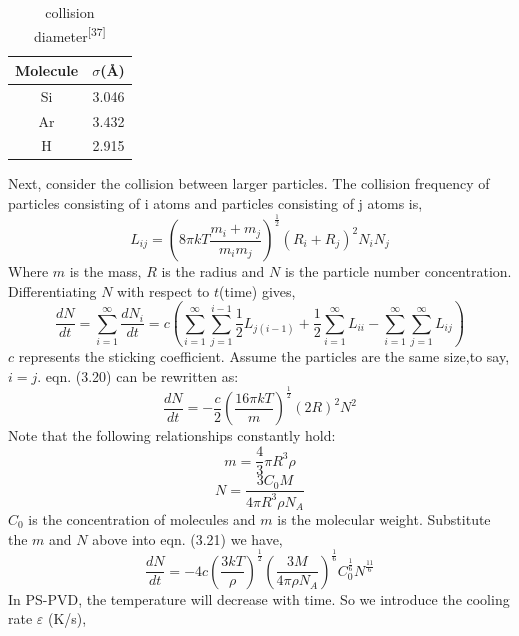 \begin{table}[H]
\caption{collision diameter\textsuperscript{[37]}}
\centering
\begin{tabular}{cc}
\toprule
Molecule &  $\sigma$(\AA) \\
\midrule
Si       & 3.046 \\
Ar       & 3.432 \\
H        & 2.915 \\
\bottomrule
\end{tabular}
\end{table}
Next, consider the collision between larger particles. 
The collision frequency of particles consisting of i atoms and particles consisting of j atoms is,
\begin{equation}
L_{i j}=\left(8 \pi k T \frac{m_{i}+m_{j}}{m_{i} m_{j}}\right)^{\frac{1}{2}}\left(R_{i}+R_{j}\right)^{2} N_{i} N_{j}
\tag{3.1.19}
\end{equation}
Where $m$ is the mass, $R$ is the radius and $N$ is the particle number concentration.
Differentiating $N$ with respect to $t$(time) gives,
\begin{equation}
\frac{d N}{d t}=\sum_{i=1}^{\infty} \frac{d N_{i}}{d t}=c\left(\sum_{i=1}^{\infty} \sum_{j=1}^{i-1} \frac{1}{2} L_{j(i-1)}+\frac{1}{2} \sum_{i=1}^{\infty} L_{ii}-\sum_{i=1}^{\infty} \sum_{j=1}^{\infty} L_{i j}\right)
\tag{3.1.20}
\end{equation}
$c$ represents the sticking coefficient.
Assume the particles are the same size,to say, $i = j$.  eqn. (3.20) can be rewritten as:
\begin{equation}
\frac{d N}{d t}=-\frac{c}{2}\left(\frac{16 \pi k T}{m}\right)^{\frac{1}{2}}(2 R)^{2} N^{2}
\tag{3.1.21}
\end{equation}
Note that the following relationships  constantly hold:
\begin{equation}
m=\frac{4}{3} \pi R^{3} \rho
\tag{i}
\end{equation}
\begin{equation}
N=\frac{3 C_{0} M}{4 \pi R^{3} \rho N_{A}}
\tag{ii}
\end{equation}
$C_{0}$  is the concentration of molecules and $m$ is the molecular weight.
Substitute the $m$ and $N$ above into eqn. (3.21) we have,
\begin{equation}
\frac{d N}{d t}=-4 c\left(\frac{3 k T}{\rho}\right)^{\frac{1}{2}}\left(\frac{3 M}{4 \pi \rho N_{A}}\right)^{\frac{1}{6}} C_{0}^{\frac{1}{6}} N^{\frac{11}{6}}
\tag{3.1.22}
\end{equation}
In PS-PVD, the temperature will decrease with time. So we introduce the cooling rate $\varepsilon $ (K/s),
